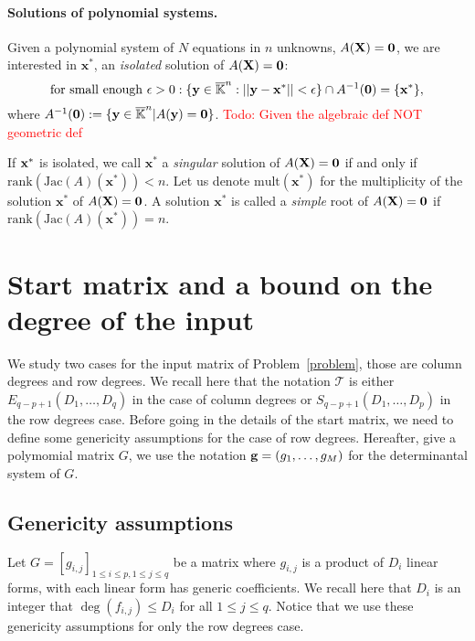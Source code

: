 \documentclass[11pt]{article}
\numberwithin{Property}{section}
\numberwithin{Theorem}{section}
\numberwithin{Proposition}{section}
\numberwithin{Lemma}{section}
\numberwithin{Corollary}{section}
\numberwithin{Definition}{section}
\numberwithin{Remark}{section}
\numberwithin{Conjecture}{section}
\numberwithin{Problem}{section}
\numberwithin{Claim}{section}
\theoremstyle{definition}
\numberwithin{Example}{section}
\renewcommand{\leq}{\leqslant}
\def\bar{\overline}
\newcommand{\field}{\mathbb{K}} %
\newcommand{\mat}[1]{\mathbf{\MakeUppercase{#1}}} %
\newcommand{\todo}[1]{\textcolor{red}{#1}} %
\begin{document}
\paragraph{Solutions of polynomial systems.} Given a polynomial system of $N$ equations in $n$ unknowns, $A(\mat{X}) = \mat{0}$, we are interested in $\mathbf{x}^*$, an \emph{isolated} solution of $A(\mat{X}) = \mat{0}$:
\[
\mathrm{for \ small \ enough} \ \epsilon > 0 : \{\mathbf{y} \in \bar{\field}^n : ||\mathbf{y} - \mathbf{x}^*|| < \epsilon\} \cap A^{-1}(\mat{0}) = \{\mathbf{x}^*\}, 
\] where $A^{-1}(\mat{0}) := \{\mathbf{y} \in \bar{\field}^n | A(\mathbf{y}) = \mat{0}\}$. 
\todo{Todo: Given the algebraic def NOT geometric def}

If ${\bf x}^*$ is isolated, we call $\mathbf{x}^*$ a \emph{singular} solution of $A(\mat{X}) = \mat{0}$ if and only if $\mathrm{rank}(\mathrm{Jac}(A)(\mathbf{x}^*)) < n$.  Let us denote $\mathrm{mult}(\mathbf{x}^*)$ for the multiplicity of the solution $\mathbf{x}^*$ of $A(\mat{X}) = \mat{0}$.   A solution $\mathbf{x}^*$ is called a \emph{simple} root of $A(\mat{X}) = \mat{0}$ if  $\mathrm{rank}(\mathrm{Jac}(A)(\mathbf{x}^*)) = n$.

\section{Start matrix and a bound on the degree of the input}
\label{sec:startbound}
We study two cases for the input matrix of Problem~\ref{problem}, those are column degrees and row degrees. We recall here that the notation $\mathcal{T}$ is either $E_{q-p+1}(D_1, \ldots, D_q)$ in the case of column degrees or $S_{q-p+1}(D_1, \ldots, D_p)$ in the row degrees case. Before going in the details of the start matrix, we need to define some genericity assumptions for the case of row degrees. Hereafter, give a polymomial matrix $G$, we use the notation ${\bf g} = (g_1, \ldots, g_M)$ for the determinantal system of $G$. 
\subsection{Genericity assumptions}
\label{subsec:genericity}
Let $G = [g_{i,j}]_{1 \leq i \leq p, 1 \leq j \leq q}$ be a matrix where $g_{i,j}$ is a product of $D_i$ linear forms, with each linear form has generic coefficients. We recall here that $D_i$ is an integer that $\deg(f_{i,j}) \leq D_i$ for all $1 \leq j \leq q$. Notice that we use these genericity assumptions for only the row degrees case. 
\end{document}
